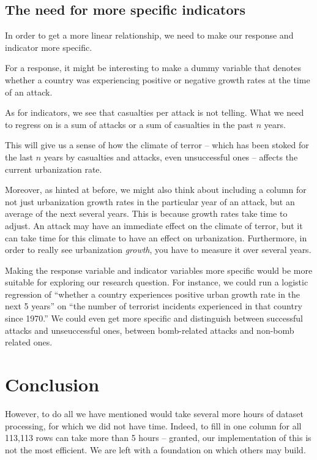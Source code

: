 \documentclass[preprint,2p,12pt]{elsarticle}
\begin{document}
\subsection{The need for more specific indicators}
In order to get a more linear relationship, we need to make our response and indicator more specific.

For a response, it might be interesting to make a dummy variable that denotes whether a country was experiencing positive or negative growth rates at the time of an attack.

As for indicators, we see that casualties per attack is not telling.
What we need to regress on is a sum of attacks or a sum of casualties in the past $n$ years.

This will give us a sense of how the climate of terror -- which has been stoked for the last $n$ years by casualties and attacks, even unsuccessful ones -- affects the current urbanization rate.

Moreover, as hinted at before, we might also think about including a column for not just urbanization growth rates in the particular year of an attack, but an average of the next several years. This is because growth rates take time to adjust. An attack may have an immediate effect on the climate of terror, but it can take time for this climate to have an effect on urbanization. Furthermore, in order to really see urbanization \emph{growth}, you have to measure it over several years.

Making the response variable and indicator variables more specific would be more suitable for exploring our research question.
For instance, we could run a logistic regression of ``whether a country experiences positive urban growth rate in the next 5 years'' on ``the number of terrorist incidents experienced in that country since 1970.''
We could even get more specific and distinguish between successful attacks and unseuccessful ones, between bomb-related attacks and non-bomb related ones.


\section{Conclusion}
However, to do all we have mentioned would take several more hours of dataset processing, for which we did not have time.
Indeed, to fill in one column for all 113,113 rows can take more than 5 hours -- granted, our implementation of this is not the most efficient.
We are left with a foundation on which others may build.
\end{document}
